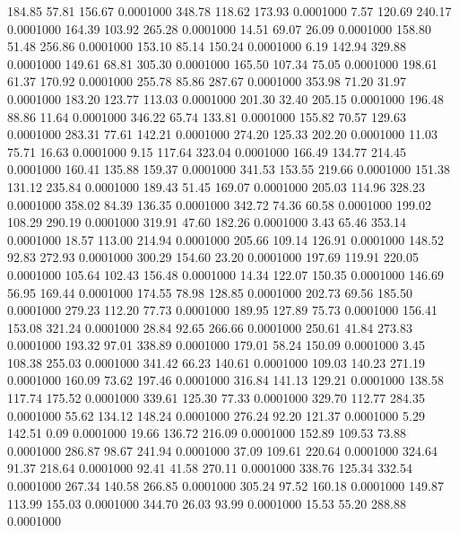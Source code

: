  184.85   57.81  156.67   0.0001000
 348.78  118.62  173.93   0.0001000
   7.57  120.69  240.17   0.0001000
 164.39  103.92  265.28   0.0001000
  14.51   69.07   26.09   0.0001000
 158.80   51.48  256.86   0.0001000
 153.10   85.14  150.24   0.0001000
   6.19  142.94  329.88   0.0001000
 149.61   68.81  305.30   0.0001000
 165.50  107.34   75.05   0.0001000
 198.61   61.37  170.92   0.0001000
 255.78   85.86  287.67   0.0001000
 353.98   71.20   31.97   0.0001000
 183.20  123.77  113.03   0.0001000
 201.30   32.40  205.15   0.0001000
 196.48   88.86   11.64   0.0001000
 346.22   65.74  133.81   0.0001000
 155.82   70.57  129.63   0.0001000
 283.31   77.61  142.21   0.0001000
 274.20  125.33  202.20   0.0001000
  11.03   75.71   16.63   0.0001000
   9.15  117.64  323.04   0.0001000
 166.49  134.77  214.45   0.0001000
 160.41  135.88  159.37   0.0001000
 341.53  153.55  219.66   0.0001000
 151.38  131.12  235.84   0.0001000
 189.43   51.45  169.07   0.0001000
 205.03  114.96  328.23   0.0001000
 358.02   84.39  136.35   0.0001000
 342.72   74.36   60.58   0.0001000
 199.02  108.29  290.19   0.0001000
 319.91   47.60  182.26   0.0001000
   3.43   65.46  353.14   0.0001000
  18.57  113.00  214.94   0.0001000
 205.66  109.14  126.91   0.0001000
 148.52   92.83  272.93   0.0001000
 300.29  154.60   23.20   0.0001000
 197.69  119.91  220.05   0.0001000
 105.64  102.43  156.48   0.0001000
  14.34  122.07  150.35   0.0001000
 146.69   56.95  169.44   0.0001000
 174.55   78.98  128.85   0.0001000
 202.73   69.56  185.50   0.0001000
 279.23  112.20   77.73   0.0001000
 189.95  127.89   75.73   0.0001000
 156.41  153.08  321.24   0.0001000
  28.84   92.65  266.66   0.0001000
 250.61   41.84  273.83   0.0001000
 193.32   97.01  338.89   0.0001000
 179.01   58.24  150.09   0.0001000
   3.45  108.38  255.03   0.0001000
 341.42   66.23  140.61   0.0001000
 109.03  140.23  271.19   0.0001000
 160.09   73.62  197.46   0.0001000
 316.84  141.13  129.21   0.0001000
 138.58  117.74  175.52   0.0001000
 339.61  125.30   77.33   0.0001000
 329.70  112.77  284.35   0.0001000
  55.62  134.12  148.24   0.0001000
 276.24   92.20  121.37   0.0001000
   5.29  142.51    0.09   0.0001000
  19.66  136.72  216.09   0.0001000
 152.89  109.53   73.88   0.0001000
 286.87   98.67  241.94   0.0001000
  37.09  109.61  220.64   0.0001000
 324.64   91.37  218.64   0.0001000
  92.41   41.58  270.11   0.0001000
 338.76  125.34  332.54   0.0001000
 267.34  140.58  266.85   0.0001000
 305.24   97.52  160.18   0.0001000
 149.87  113.99  155.03   0.0001000
 344.70   26.03   93.99   0.0001000
  15.53   55.20  288.88   0.0001000
